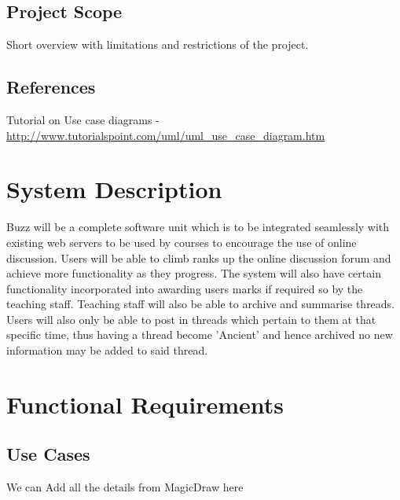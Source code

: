 \documentclass[12pt]{article}
\begin{document}
\subsection{Project Scope}
Short overview with limitations and restrictions of the project.

\subsection{References}
Tutorial on Use case diagrams - \url{http://www.tutorialspoint.com/uml/uml_use_case_diagram.htm}

\section{System Description}
Buzz will be a complete software unit which is to be integrated seamlessly with existing web servers to be used by courses to encourage the use of online discussion. Users will be able to climb ranks up the online discussion forum and achieve more functionality as they progress. The system will also have certain functionality incorporated into awarding users marks if required so by the teaching staff. Teaching staff will also be able to archive and summarise threads. Users will also only be able to post in threads which pertain to them at that specific time, thus having a thread become 'Ancient' and hence archived no new information may be added to said thread.
\newpage %
\section{Functional Requirements}

\subsection{Use Cases}
We can Add all the details from MagicDraw here
\begin{center}

\end{center}
\newpage %
\end{document}
